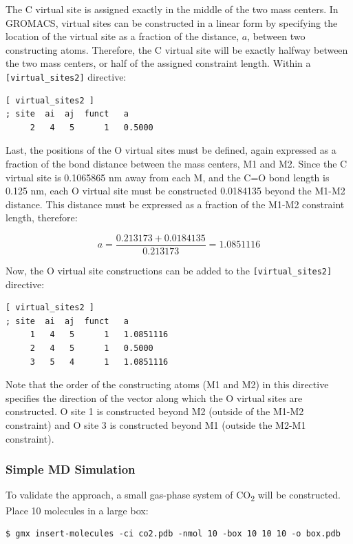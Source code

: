 \documentclass[9pt,tutorial,pubversion]{livecoms}
\begin{document}
The C virtual site is assigned exactly in the middle of the two mass centers. In GROMACS, virtual sites can be constructed in a linear form by specifying the location of the virtual site as a fraction of the distance, $a$, between two constructing atoms. Therefore, the C virtual site will be exactly halfway between the two mass centers, or half of the assigned constraint length. Within a \texttt{[virtual\_sites2]} directive: 

\begin{lstlisting}
[ virtual_sites2 ]
; site  ai  aj  funct   a
     2   4   5      1   0.5000
\end{lstlisting}

Last, the positions of the O virtual sites must be defined, again expressed as a fraction of the bond distance between the mass centers, M1 and M2. Since the C virtual site is 0.1065865 nm away from each M, and the C=O bond length is 0.125 nm, each O virtual site must be constructed 0.0184135 beyond the M1-M2 distance. This distance must be expressed as a fraction of the M1-M2 constraint length, therefore:

\begin{equation}
a = \frac{0.213173+0.0184135}{0.213173} = 1.0851116
\end{equation}

Now, the O virtual site constructions can be added to the \texttt{[virtual\_sites2]} directive:

\begin{lstlisting}
[ virtual_sites2 ]
; site  ai  aj  funct   a
     1   4   5      1   1.0851116
     2   4   5      1   0.5000 
     3   5   4      1   1.0851116
\end{lstlisting}

Note that the order of the constructing atoms (M1 and M2) in this directive specifies the direction of the vector along which the O virtual sites are constructed. O site 1 is constructed beyond M2 (outside of the M1-M2 constraint) and O site 3 is constructed beyond M1 (outside the M2-M1 constraint).

\subsubsection{Simple MD Simulation} \label{vsite_md}

To validate the approach, a small gas-phase system of CO\textsubscript{2} will be constructed. Place 10 molecules in a large box:

\begin{lstlisting}
$ gmx insert-molecules -ci co2.pdb -nmol 10 -box 10 10 10 -o box.pdb
\end{lstlisting}
\end{document}
